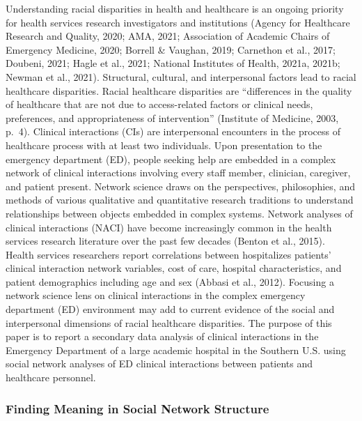 \documentclass[
]{article}
\begin{document}
Understanding racial disparities in health and healthcare is an ongoing
priority for health services research investigators and institutions
(Agency for Healthcare Research and Quality, 2020; AMA, 2021;
Association of Academic Chairs of Emergency Medicine, 2020; Borrell \&
Vaughan, 2019; Carnethon et al., 2017; Doubeni, 2021; Hagle et al.,
2021; National Institutes of Health, 2021a, 2021b; Newman et al., 2021).
Structural, cultural, and interpersonal factors lead to racial
healthcare disparities. Racial healthcare disparities are ``differences
in the quality of healthcare that are not due to access-related factors
or clinical needs, preferences, and appropriateness of intervention''
(Institute of Medicine, 2003, p.~4). Clinical interactions (CIs) are
interpersonal encounters in the process of healthcare process with at
least two individuals. Upon presentation to the emergency department
(ED), people seeking help are embedded in a complex network of clinical
interactions involving every staff member, clinician, caregiver, and
patient present. Network science draws on the perspectives,
philosophies, and methods of various qualitative and quantitative
research traditions to understand relationships between objects embedded
in complex systems. Network analyses of clinical interactions (NACI)
have become increasingly common in the health services research
literature over the past few decades (Benton et al., 2015). Health
services researchers report correlations between hospitalizes patients'
clinical interaction network variables, cost of care, hospital
characteristics, and patient demographics including age and sex (Abbasi
et al., 2012). Focusing a network science lens on clinical interactions
in the complex emergency department (ED) environment may add to current
evidence of the social and interpersonal dimensions of racial healthcare
disparities. The purpose of this paper is to report a secondary data
analysis of clinical interactions in the Emergency Department of a large
academic hospital in the Southern U.S. using social network analyses of
ED clinical interactions between patients and healthcare personnel.

\hypertarget{finding-meaning-in-social-network-structure}{%
\subsubsection{Finding Meaning in Social Network
Structure}\label{finding-meaning-in-social-network-structure}}
\end{document}
